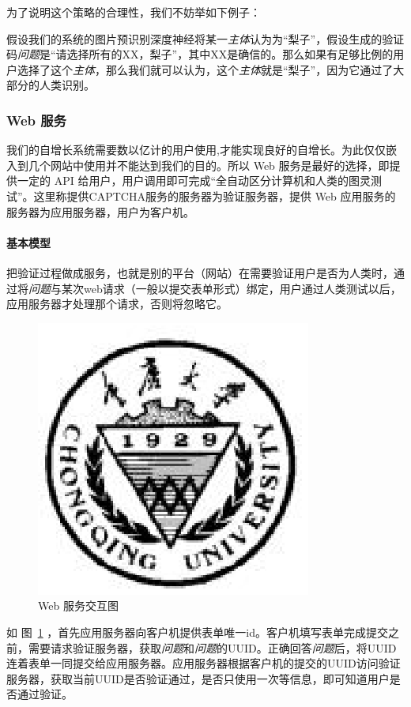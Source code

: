 \documentclass[bachelor,zhspacing]{cqu}  %
\begin{document}
为了说明这个策略的合理性，我们不妨举如下例子：

假设我们的系统的图片预识别深度神经将某一\emph{主体}认为为``梨子''，假设生成的验证码\emph{问题}是``请选择所有的XX，梨子''，其中XX是确信的。那么如果有足够比例的用户选择了这个\emph{主体}，那么我们就可以认为，这个\emph{主体}就是``梨子''，因为它通过了大部分的人类识别。

\subsubsection{Web 服务}\label{web-ux670dux52a1}

我们的自增长系统需要数以亿计的用户使用,才能实现良好的自增长。为此仅仅嵌入到几个网站中使用并不能达到我们的目的。所以
Web 服务是最好的选择，即提供一定的 API
给用户，用户调用即可完成``全自动区分计算机和人类的图灵测试''。这里称提供CAPTCHA服务的服务器为验证服务器，提供
Web 应用服务的服务器为应用服务器，用户为客户机。

\paragraph{基本模型}\label{ux57faux672cux6a21ux578b}

把验证过程做成服务，也就是别的平台（网站）在需要验证用户是否为人类时，通过将\emph{问题}与某次web请求（一般以提交表单形式）绑定，用户通过人类测试以后，应用服务器才处理那个请求，否则将忽略它。

\begin{figure}[htbp]
\centering
\includegraphics{pic/cqu.eps}
\caption{Web 服务交互图}\label{fig:base-interaction}
\end{figure}

如 图~\ref{fig:base-interaction}
，首先应用服务器向客户机提供表单唯一id。客户机填写表单完成提交之前，需要请求验证服务器，获取\emph{问题}和\emph{问题}的UUID。正确回答\emph{问题}后，将UUID连着表单一同提交给应用服务器。应用服务器根据客户机的提交的UUID访问验证服务器，获取当前UUID是否验证通过，是否只使用一次等信息，即可知道用户是否通过验证。
\end{document}
